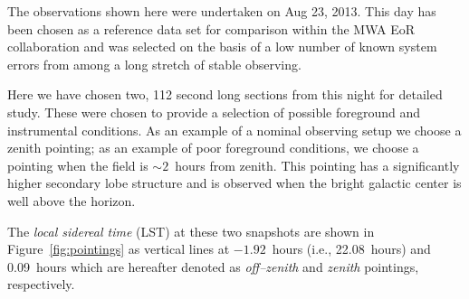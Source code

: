 \documentclass[preprint2,iop,numberedappendix]{emulateapj}
\begin{document}
The observations shown here were undertaken on Aug 23, 2013. This day has been chosen as a reference data set for comparison within the MWA EoR collaboration and was selected on the basis of a low number of known system errors from among a long stretch of stable observing.  

Here we have chosen two, 112 second long sections from this night for detailed study. These were chosen to provide a selection of possible foreground and instrumental conditions. As an example of a nominal observing setup we choose a zenith pointing; as an example of poor foreground conditions, we choose a pointing when the field is $\sim 2$~hours from zenith. This pointing has a significantly higher secondary lobe structure and is observed when the bright galactic center is well above the horizon. 

The {\it local sidereal time} (LST) at these two snapshots are shown in Figure~\ref{fig:pointings} as vertical lines at $-1.92$~hours (i.e., 22.08~hours) and 0.09~hours which are hereafter denoted as {\it off--zenith} and {\it zenith} pointings, respectively. %
\end{document}
